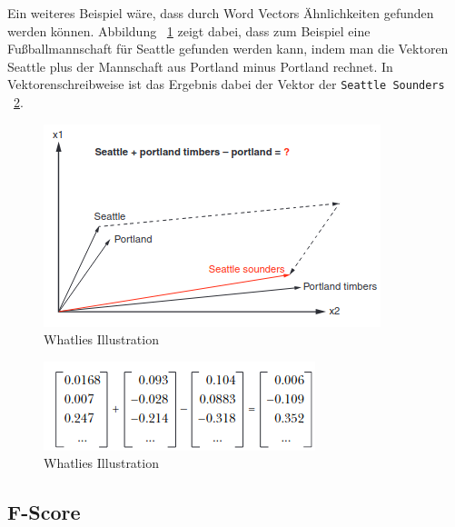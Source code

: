 Ein weiteres Beispiel wäre, dass durch Word Vectors Ähnlichkeiten gefunden werden können.
Abbildung ~\ref{fig:geometry-word2vec} zeigt dabei, dass zum Beispiel eine Fußballmannschaft für Seattle gefunden werden kann, indem man die Vektoren Seattle plus der Mannschaft aus Portland minus Portland rechnet.
In Vektorenschreibweise ist das Ergebnis dabei der Vektor der \texttt{Seattle Sounders} ~\ref{fig:compute-word2vec}.\cite{nlpInAction}

\begin{figure}[hbt!]
    \centering
    \includegraphics[scale=1]{pics/geometry-word2vec}
    \caption{Whatlies Illustration~\cite{whatlies}}
    \label{fig:geometry-word2vec}
\end{figure}

\begin{figure}[hbt!]
    \centering
    \includegraphics[scale=1]{pics/compute-word2vec}
    \caption{Whatlies Illustration~\cite{whatlies}}
    \label{fig:compute-word2vec}
\end{figure}


\subsection{F-Score}\label{subsec:F-Score}

